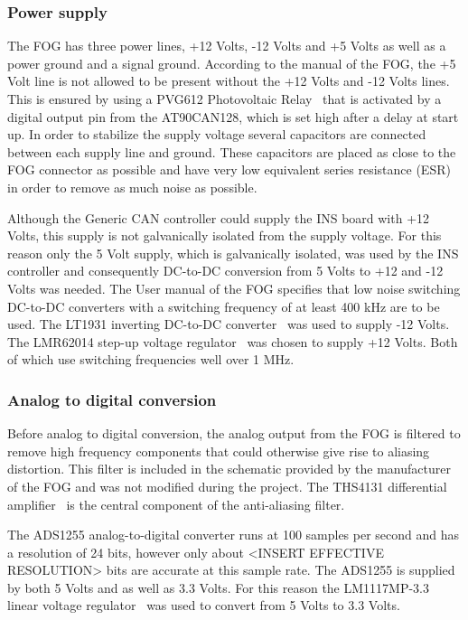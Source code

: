 \subsubsection{Power supply}
The FOG has three power lines, +12 Volts, -12 Volts and +5 Volts as well as a power ground and a signal ground. \newline
According to the manual of the FOG, the +5 Volt line is not allowed to be present without the +12 Volts and -12 Volts lines. This is ensured by using a PVG612 Photovoltaic Relay~\cite{web:pvg612a} that is activated by a digital output pin from the AT90CAN128, which is set high after a delay at start up. \newline
In order to stabilize the supply voltage several capacitors are connected between each supply line and ground. These capacitors are placed as close to the FOG connector as possible and have very low equivalent series resistance (ESR) in order to remove as much noise as possible. 

Although the Generic CAN controller could supply the INS board with +12 Volts, this supply is not galvanically isolated from the supply voltage. For this reason only the 5 Volt supply, which is galvanically isolated, was used by the INS controller and consequently DC-to-DC conversion from 5 Volts to +12 and -12 Volts was needed. \newline
The User manual of the FOG specifies that low noise switching DC-to-DC converters with a switching frequency of at least 400 kHz are to be used. The LT1931 inverting DC-to-DC converter~\cite{web:lt1931} was used to supply -12 Volts. The LMR62014 step-up voltage regulator~\cite{web:lmr62014} was chosen to supply +12 Volts. Both of which use switching frequencies well over 1 MHz.


\subsubsection{Analog to digital conversion}
Before analog to digital conversion, the analog output from the FOG is filtered to remove high frequency components that could otherwise give rise to aliasing distortion. This filter is included in the schematic provided by the manufacturer of the FOG and was not modified during the project. \newline
The THS4131 differential amplifier~\cite{web:ths4131} is the central component of the anti-aliasing filter. 

The ADS1255 analog-to-digital converter runs at 100 samples per second and has a resolution of 24 bits, however only about <INSERT EFFECTIVE RESOLUTION> bits are accurate at this sample rate. \newline
The ADS1255 is supplied by both 5 Volts and as well as 3.3 Volts. For this reason the LM1117MP-3.3 linear voltage regulator~\cite{web:lm1117} was used to convert from 5 Volts to 3.3 Volts. 

